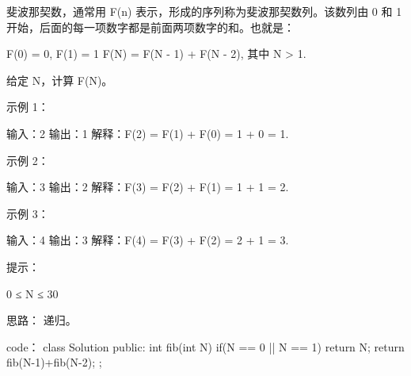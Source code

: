 斐波那契数，通常用 F(n) 表示，形成的序列称为斐波那契数列。该数列由 0 和 1 开始，后面的每一项数字都是前面两项数字的和。也就是：

F(0) = 0,   F(1) = 1
F(N) = F(N - 1) + F(N - 2), 其中 N > 1.

给定 N，计算 F(N)。

 

示例 1：

输入：2
输出：1
解释：F(2) = F(1) + F(0) = 1 + 0 = 1.

示例 2：

输入：3
输出：2
解释：F(3) = F(2) + F(1) = 1 + 1 = 2.

示例 3：

输入：4
输出：3
解释：F(4) = F(3) + F(2) = 2 + 1 = 3.

 

提示：

    0 ≤ N ≤ 30








































思路：
递归。




































code：
class Solution {
public:
    int fib(int N) {
        if(N == 0 || N == 1) return N;
        return fib(N-1)+fib(N-2);
    }
};